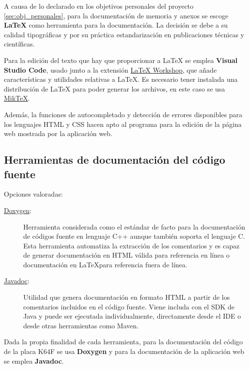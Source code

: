 A causa de lo declarado en los objetivos personales del proyecto
\ref{sec:obj_personales}, para la documentación de memoria y anexos se escoge
\textbf{\LaTeX{}} como herramienta para la documentación. La decisión se debe a
su calidad tipográficas y por su práctica estandarización en publicaciones
técnicas y científicas.

Para la edición del texto que hay que proporcionar a \LaTeX{} se emplea
\textbf{Visual Studio Code}, usado junto a la extensión \href{https://marketplace.visualstudio.com/items?itemName=James-Yu.latex-workshop}
{LaTeX Workshop}, que añade características y utilidades relativas a \LaTeX.
Es necesario tener instalada una distribución de \LaTeX{} para poder generar los
archivos, en este caso se usa \href{https://miktex.org/}{MikTeX}.

Además, la funciones de autocompletado y detección de errores disponibles para
los lenguajes HTML y CSS hacen apto al programa para la edición de la página
web mostrada por la aplicación web.

\subsection{Herramientas de documentación del código fuente}
{\label{sec:source-docs}}
Opciones valoradas:
\begin{description}
  \item[\href{http://www.doxygen.nl/}{Doxygen}:] Herramienta considerada como
  el estándar de facto para la documentación de códigos fuente en lenguaje C++
  aunque también soporta el lenguaje C. Esta herramienta automatiza la
  extracción de los comentarios y es capaz de generar documentación en HTML
  válida para referencia en línea o documentación en \LaTeX para referencia
  fuera de línea.
  \item[\href{https://www.oracle.com/technetwork/java/javase/documentation/javadoc-137458.html}
  {Javadoc}:] Utilidad que genera documentación en formato HTML a partir de los
  comentarios incluidos en el código fuente. Viene includa con el SDK de Java 
  y puede ser ejecutada individualmente, directamente desde el IDE o desde
  otras herramientas como Maven.
\end{description}

Dada la propia finalidad de cada herramienta, para la documentación del código
de la placa K64F se usa \textbf{Doxygen} y para la documentación de la
aplicación web se emplea \textbf{Javadoc}.

